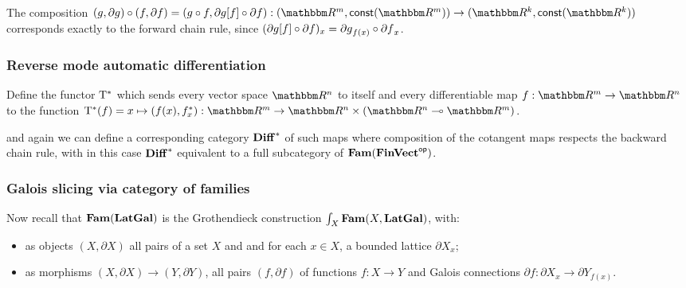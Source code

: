 \noindent The composition $(g, \partial g) \comp (f, \partial f) = (g \comp f, \reindex{\partial g}{f} \comp
\partial f): (\RR^m, \const(\RR^m)) \to (\RR^k, \const(\RR^k))$ corresponds exactly to the forward chain rule,
since $(\partial g[f] \circ \partial f)_x = {\partial g}_{f(x)} \circ {\partial f}_x$.

\subsubsection{Reverse mode automatic differentiation}

\begin{definition}
Define the functor $\mathrm{T}^*$ which sends every vector space $\RR^n$ to itself and every differentiable map
$f: \RR^m \to \RR^n$ to the function $\cotangents(f) = x \mapsto (f(x), \pullf{f}_x): \RR^m \to \RR^n \times
(\RR^n \linearto \RR^m)$.
\end{definition}

\noindent and again we can define a corresponding category $\mathbf{Diff}^*$ of such maps where composition of the
cotangent maps respects the backward chain rule, with in this case $\mathbf{Diff}^*$ equivalent to a full subcategory
of $\mathbf{Fam}(\mathbf{FinVect}^{\mathsf{op}})$.

\subsubsection{Galois slicing via category of families}

Now recall that $\mathbf{Fam}(\mathbf{LatGal})$ is the Grothendieck construction $\int_{X}\mathbf{Fam}(X, \mathbf{LatGal})$, with:
\begin{itemize}
\item as objects $(X, \partial X)$ all pairs of a set $X$ and and for each $x \in X$, a bounded lattice
$\partial X_x$;
\item as morphisms $(X, \partial X) \to (Y, \partial Y)$, all pairs $(f, \partial f)$ of functions $f: X \to
Y$ and Galois connections $\partial f: \partial X_x \to \partial Y_{f(x)}$.
\end{itemize}
